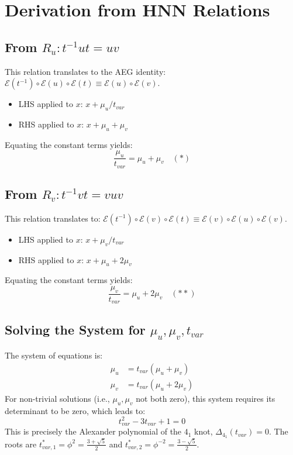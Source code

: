 \documentclass[12pt, a4paper]{article}
\begin{document}
\section{Derivation from HNN Relations}

\subsection{From $R_u: t^{-1}ut = uv$}
This relation translates to the AEG identity: $\mathcal{E}(t^{-1}) \circ \mathcal{E}(u) \circ \mathcal{E}(t) \equiv \mathcal{E}(u) \circ \mathcal{E}(v)$.
\begin{itemize}
    \item LHS applied to $x$: $x + \mu_u/t_{var}$
    \item RHS applied to $x$: $x + \mu_u + \mu_v$
\end{itemize}
Equating the constant terms yields:
$$ \frac{\mu_u}{t_{var}} = \mu_u + \mu_v \quad (*)$$

\subsection{From $R_v: t^{-1}vt = vuv$}
This relation translates to: $\mathcal{E}(t^{-1}) \circ \mathcal{E}(v) \circ \mathcal{E}(t) \equiv \mathcal{E}(v) \circ \mathcal{E}(u) \circ \mathcal{E}(v)$.
\begin{itemize}
    \item LHS applied to $x$: $x + \mu_v/t_{var}$
    \item RHS applied to $x$: $x + \mu_u + 2\mu_v$
\end{itemize}
Equating the constant terms yields:
$$ \frac{\mu_v}{t_{var}} = \mu_u + 2\mu_v \quad (**)$$

\subsection{Solving the System for $\mu_u, \mu_v, t_{var}$}
The system of equations is:
\begin{align*}
    \mu_u &= t_{var}(\mu_u + \mu_v) \\
    \mu_v &= t_{var}(\mu_u + 2\mu_v)
\end{align*}
For non-trivial solutions (i.e., $\mu_u, \mu_v$ not both zero), this system requires its determinant to be zero, which leads to:
$$ t_{var}^2 - 3t_{var} + 1 = 0 $$
This is precisely the Alexander polynomial of the $4_1$ knot, $\Delta_{4_1}(t_{var}) = 0$.
The roots are $t_{var,1}^* = \phi^2 = \frac{3+\sqrt{5}}{2}$ and $t_{var,2}^* = \phi^{-2} = \frac{3-\sqrt{5}}{2}$.
\end{document}
